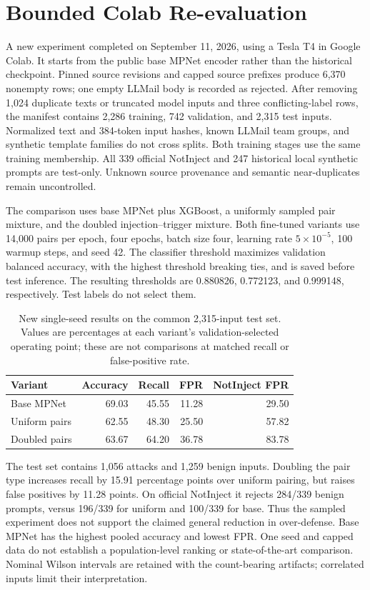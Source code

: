\documentclass[11pt, a4paper]{article}
\begin{document}
\section{Bounded Colab Re-evaluation}
\label{sec:colab}
A new experiment completed on September 11, 2026, using a Tesla T4 in
Google Colab. It starts from the public base MPNet encoder rather than the
historical checkpoint. Pinned source revisions and capped source prefixes
produce 6,370 nonempty rows; one empty LLMail body is recorded as rejected.
After removing 1,024 duplicate texts or truncated model inputs and three
conflicting-label rows, the manifest contains 2,286 training, 742 validation,
and 2,315 test inputs. Normalized text and 384-token input hashes, known
LLMail team groups, and synthetic template families do not cross splits.
Both training stages use the same training membership. All 339 official
NotInject and 247 historical local synthetic prompts are test-only.
Unknown source provenance and semantic near-duplicates remain uncontrolled.

The comparison uses base MPNet plus XGBoost, a uniformly sampled pair
mixture, and the doubled injection--trigger mixture. Both fine-tuned
variants use 14,000 pairs per epoch, four epochs, batch size four, learning
rate $5\times10^{-5}$, 100 warmup steps, and seed 42. The classifier threshold
maximizes validation balanced accuracy, with the highest threshold breaking
ties, and is saved before test inference. The resulting thresholds are
0.880826, 0.772123, and 0.999148, respectively. Test labels do not select them.

\begin{table}[htbp]
\centering
\caption{New single-seed results on the common 2,315-input test set. Values
are percentages at each variant's validation-selected operating point;
these are not comparisons at matched recall or false-positive rate.}
\begin{tabular}{lrrrr}
\toprule
Variant & Accuracy & Recall & FPR & NotInject FPR \\
\midrule
Base MPNet & 69.03 & 45.55 & 11.28 & 29.50 \\
Uniform pairs & 62.55 & 48.30 & 25.50 & 57.82 \\
Doubled pairs & 63.67 & 64.20 & 36.78 & 83.78 \\
\bottomrule
\end{tabular}
\label{tab:colab}
\end{table}

The test set contains 1,056 attacks and 1,259 benign inputs. Doubling the
pair type increases recall by 15.91 percentage points over uniform pairing,
but raises false positives by 11.28 points. On official NotInject it rejects
284/339 benign prompts, versus 196/339 for uniform and 100/339 for base.
Thus the sampled experiment does not support the claimed general reduction
in over-defense. Base MPNet has the highest pooled accuracy and lowest FPR.
One seed and capped data do not establish a population-level ranking or
state-of-the-art comparison. Nominal Wilson intervals are retained with the
count-bearing artifacts; correlated inputs limit their interpretation.
\end{document}

